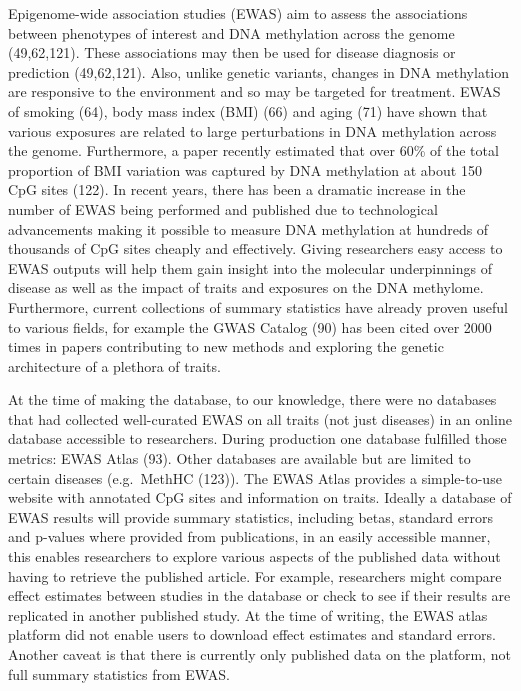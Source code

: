 \documentclass[11pt,oneside]{bristolthesis}
\begin{document}
Epigenome-wide association studies (EWAS) aim to assess the associations between phenotypes of interest and DNA methylation across the genome (49,62,121). These associations may then be used for disease diagnosis or prediction (49,62,121). Also, unlike genetic variants, changes in DNA methylation are responsive to the environment and so may be targeted for treatment. EWAS of smoking (64), body mass index (BMI) (66) and aging (71) have shown that various exposures are related to large perturbations in DNA methylation across the genome. Furthermore, a paper recently estimated that over 60\% of the total proportion of BMI variation was captured by DNA methylation at about 150 CpG sites (122). In recent years, there has been a dramatic increase in the number of EWAS being performed and published due to technological advancements making it possible to measure DNA methylation at hundreds of thousands of CpG sites cheaply and effectively. Giving researchers easy access to EWAS outputs will help them gain insight into the molecular underpinnings of disease as well as the impact of traits and exposures on the DNA methylome. Furthermore, current collections of summary statistics have already proven useful to various fields, for example the GWAS Catalog (90) has been cited over 2000 times in papers contributing to new methods and exploring the genetic architecture of a plethora of traits.

At the time of making the database, to our knowledge, there were no databases that had collected well-curated EWAS on all traits (not just diseases) in an online database accessible to researchers. During production one database fulfilled those metrics: EWAS Atlas (93). Other databases are available but are limited to certain diseases (e.g.~MethHC (123)). The EWAS Atlas provides a simple-to-use website with annotated CpG sites and information on traits. Ideally a database of EWAS results will provide summary statistics, including betas, standard errors and p-values where provided from publications, in an easily accessible manner, this enables researchers to explore various aspects of the published data without having to retrieve the published article. For example, researchers might compare effect estimates between studies in the database or check to see if their results are replicated in another published study. At the time of writing, the EWAS atlas platform did not enable users to download effect estimates and standard errors. Another caveat is that there is currently only published data on the platform, not full summary statistics from EWAS.
\end{document}
